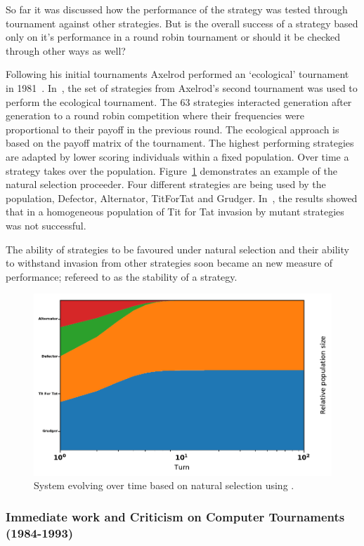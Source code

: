 \documentclass{article}
\begin{document}
So far it was discussed how the performance of the strategy was tested through
tournament against other strategies. But is the overall success of a strategy
based only on it's performance in a round robin tournament or should it be
checked through other ways as well?

Following his initial tournaments Axelrod performed an `ecological' tournament
in 1981~\cite{Axelrod1984}. In~\cite{Axelrod1984}, the set of strategies from
Axelrod's second tournament was used to perform the ecological tournament. The
63 strategies interacted generation after generation to a round robin competition
where their frequencies were proportional to their payoff in the previous round.
The ecological approach is based on the payoff matrix of the tournament. The
highest performing strategies are adapted by lower scoring individuals
within a fixed population. Over time a strategy takes over the population.
Figure~\ref{fig:ecological.tournament} demonstrates an example of the
natural selection proceeder. Four different strategies are being used by the
population, Defector, Alternator, TitForTat and Grudger. In~\cite{Axelrod1984},
the results showed that in a homogeneous population of Tit for Tat invasion by
mutant strategies was not successful.

The ability of strategies to be favoured under natural selection and their
ability to withstand invasion from other strategies soon became an new measure
of performance; refereed to as the stability of a strategy.

\begin{figure}[!hbtp]
    \centering
    \includegraphics[width=.6\textwidth]{./assets/images/ecological.pdf}
    \caption{System evolving over time based on natural selection using
    \cite{axelrodproject}.}
    \label{fig:ecological.tournament}
\end{figure}

\subsubsection{Immediate work and Criticism on Computer Tournaments (1984-1993)}
\end{document}
